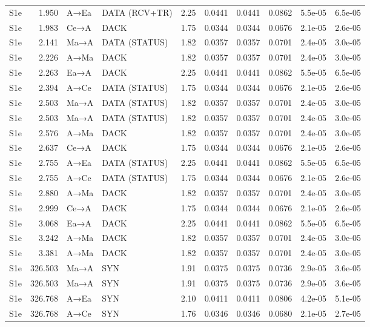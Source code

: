 \documentclass[10pt,letterpaper]{article}
\begin{document}
{\begin{longtable}{@{}lrllrrrrrr@{}}
S1e & 1.950 & A→Ea & DATA (RCV+TR) & 2.25 & 0.0441 & 0.0441 & 0.0862 & 5.5e-05 & 6.5e-05 \\
S1e & 1.983 & Ce→A & DACK & 1.75 & 0.0344 & 0.0344 & 0.0676 & 2.1e-05 & 2.6e-05 \\
S1e & 2.141 & Ma→A & DATA (STATUS) & 1.82 & 0.0357 & 0.0357 & 0.0701 & 2.4e-05 & 3.0e-05 \\
S1e & 2.226 & A→Ma & DACK & 1.82 & 0.0357 & 0.0357 & 0.0701 & 2.4e-05 & 3.0e-05 \\
S1e & 2.263 & Ea→A & DACK & 2.25 & 0.0441 & 0.0441 & 0.0862 & 5.5e-05 & 6.5e-05 \\
S1e & 2.394 & A→Ce & DATA (STATUS) & 1.75 & 0.0344 & 0.0344 & 0.0676 & 2.1e-05 & 2.6e-05 \\
S1e & 2.503 & Ma→A & DATA (STATUS) & 1.82 & 0.0357 & 0.0357 & 0.0701 & 2.4e-05 & 3.0e-05 \\
S1e & 2.503 & Ma→A & DATA (STATUS) & 1.82 & 0.0357 & 0.0357 & 0.0701 & 2.4e-05 & 3.0e-05 \\
S1e & 2.576 & A→Ma & DACK & 1.82 & 0.0357 & 0.0357 & 0.0701 & 2.4e-05 & 3.0e-05 \\
S1e & 2.637 & Ce→A & DACK & 1.75 & 0.0344 & 0.0344 & 0.0676 & 2.1e-05 & 2.6e-05 \\
S1e & 2.755 & A→Ea & DATA (STATUS) & 2.25 & 0.0441 & 0.0441 & 0.0862 & 5.5e-05 & 6.5e-05 \\
S1e & 2.755 & A→Ce & DATA (STATUS) & 1.75 & 0.0344 & 0.0344 & 0.0676 & 2.1e-05 & 2.6e-05 \\
S1e & 2.880 & A→Ma & DACK & 1.82 & 0.0357 & 0.0357 & 0.0701 & 2.4e-05 & 3.0e-05 \\
S1e & 2.999 & Ce→A & DACK & 1.75 & 0.0344 & 0.0344 & 0.0676 & 2.1e-05 & 2.6e-05 \\
S1e & 3.068 & Ea→A & DACK & 2.25 & 0.0441 & 0.0441 & 0.0862 & 5.5e-05 & 6.5e-05 \\
S1e & 3.242 & A→Ma & DACK & 1.82 & 0.0357 & 0.0357 & 0.0701 & 2.4e-05 & 3.0e-05 \\
S1e & 3.381 & A→Ma & DACK & 1.82 & 0.0357 & 0.0357 & 0.0701 & 2.4e-05 & 3.0e-05 \\
S1e & 326.503 & Ma→A & SYN & 1.91 & 0.0375 & 0.0375 & 0.0736 & 2.9e-05 & 3.6e-05 \\
S1e & 326.503 & Ma→A & SYN & 1.91 & 0.0375 & 0.0375 & 0.0736 & 2.9e-05 & 3.6e-05 \\
S1e & 326.768 & A→Ea & SYN & 2.10 & 0.0411 & 0.0411 & 0.0806 & 4.2e-05 & 5.1e-05 \\
S1e & 326.768 & A→Ce & SYN & 1.76 & 0.0346 & 0.0346 & 0.0680 & 2.1e-05 & 2.7e-05 \\

\end{longtable}}
\end{document}
